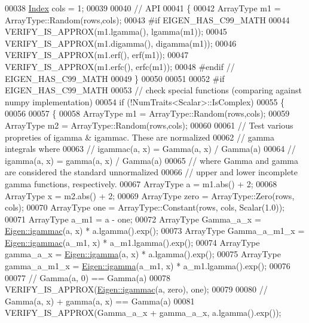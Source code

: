 \begin{DoxyCode}
00038   \hyperlink{namespace_eigen_a62e77e0933482dafde8fe197d9a2cfde}{Index} cols = 1;
00039 
00040   \textcolor{comment}{// API}
00041   \{
00042     ArrayType m1 = ArrayType::Random(rows,cols);
00043 \textcolor{preprocessor}{#if EIGEN\_HAS\_C99\_MATH}
00044     VERIFY\_IS\_APPROX(m1.lgamma(), lgamma(m1));
00045     VERIFY\_IS\_APPROX(m1.digamma(), digamma(m1));
00046     VERIFY\_IS\_APPROX(m1.erf(), erf(m1));
00047     VERIFY\_IS\_APPROX(m1.erfc(), erfc(m1));
00048 \textcolor{preprocessor}{#endif  // EIGEN\_HAS\_C99\_MATH}
00049   \}
00050 
00051 
00052 \textcolor{preprocessor}{#if EIGEN\_HAS\_C99\_MATH}
00053   \textcolor{comment}{// check special functions (comparing against numpy implementation)}
00054   \textcolor{keywordflow}{if} (!NumTraits<Scalar>::IsComplex)
00055   \{
00056 
00057     \{
00058       ArrayType m1 = ArrayType::Random(rows,cols);
00059       ArrayType m2 = ArrayType::Random(rows,cols);
00060 
00061       \textcolor{comment}{// Test various propreties of igamma & igammac.  These are normalized}
00062       \textcolor{comment}{// gamma integrals where}
00063       \textcolor{comment}{//   igammac(a, x) = Gamma(a, x) / Gamma(a)}
00064       \textcolor{comment}{//   igamma(a, x) = gamma(a, x) / Gamma(a)}
00065       \textcolor{comment}{// where Gamma and gamma are considered the standard unnormalized}
00066       \textcolor{comment}{// upper and lower incomplete gamma functions, respectively.}
00067       ArrayType a = m1.abs() + 2;
00068       ArrayType x = m2.abs() + 2;
00069       ArrayType zero = ArrayType::Zero(rows, cols);
00070       ArrayType one = ArrayType::Constant(rows, cols, Scalar(1.0));
00071       ArrayType a\_m1 = a - one;
00072       ArrayType Gamma\_a\_x = \hyperlink{namespace_eigen_a1abaa2ff8c7b1871eaf026a47c6bbf3b}{Eigen::igammac}(a, x) * a.lgamma().exp();
00073       ArrayType Gamma\_a\_m1\_x = \hyperlink{namespace_eigen_a1abaa2ff8c7b1871eaf026a47c6bbf3b}{Eigen::igammac}(a\_m1, x) * a\_m1.lgamma().exp();
00074       ArrayType gamma\_a\_x = \hyperlink{namespace_eigen_af5aa651137636b1cdbd27de1cfe91148}{Eigen::igamma}(a, x) * a.lgamma().exp();
00075       ArrayType gamma\_a\_m1\_x = \hyperlink{namespace_eigen_af5aa651137636b1cdbd27de1cfe91148}{Eigen::igamma}(a\_m1, x) * a\_m1.lgamma().exp();
00076 
00077       \textcolor{comment}{// Gamma(a, 0) == Gamma(a)}
00078       VERIFY\_IS\_APPROX(\hyperlink{namespace_eigen_a1abaa2ff8c7b1871eaf026a47c6bbf3b}{Eigen::igammac}(a, zero), one);
00079 
00080       \textcolor{comment}{// Gamma(a, x) + gamma(a, x) == Gamma(a)}
00081       VERIFY\_IS\_APPROX(Gamma\_a\_x + gamma\_a\_x, a.lgamma().exp());

\end{DoxyCode}
